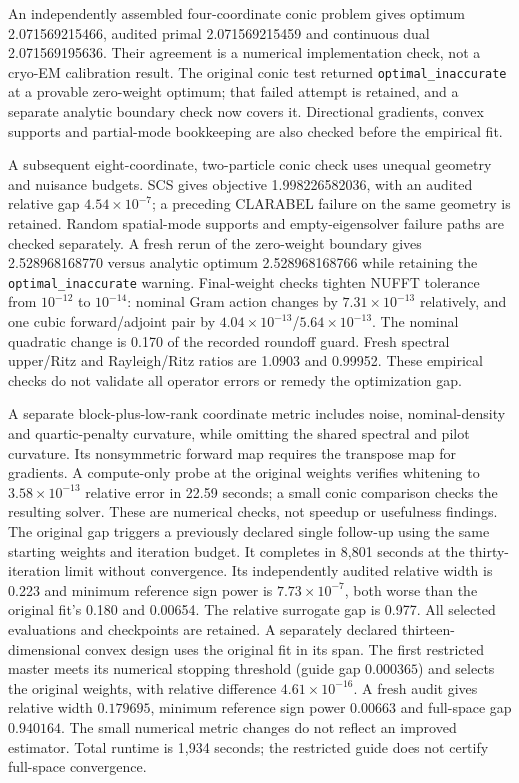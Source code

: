 An independently assembled four-coordinate conic problem gives optimum
2.071569215466, audited primal 2.071569215459 and continuous dual
2.071569195636. Their agreement is a numerical implementation check, not a
cryo-EM calibration result. The original conic test returned
\texttt{optimal\_inaccurate} at a provable zero-weight optimum; that failed
attempt is retained, and a separate analytic boundary check now covers it.
Directional gradients, convex supports and partial-mode bookkeeping are also
checked before the empirical fit.

A subsequent eight-coordinate, two-particle conic check uses unequal geometry
and nuisance budgets. SCS gives objective 1.998226582036, with an audited
relative gap $4.54\times10^{-7}$; a preceding CLARABEL failure on the same
geometry is retained. Random spatial-mode supports and empty-eigensolver failure
paths are checked separately. A fresh rerun of the zero-weight boundary gives
2.528968168770 versus analytic optimum 2.528968168766 while retaining the
\texttt{optimal\_inaccurate} warning. Final-weight checks tighten NUFFT
tolerance from $10^{-12}$ to $10^{-14}$: nominal Gram action changes by
$7.31\times10^{-13}$ relatively, and one cubic forward/adjoint pair by
$4.04\times10^{-13}$/$5.64\times10^{-13}$. The nominal quadratic change is
0.170 of the recorded roundoff guard. Fresh spectral upper/Ritz and
Rayleigh/Ritz ratios are 1.0903 and 0.99952. These empirical checks do not
validate all operator errors or remedy the optimization gap.

A separate block-plus-low-rank coordinate metric includes noise, nominal-density
and quartic-penalty curvature, while omitting the shared spectral and pilot
curvature. Its nonsymmetric forward map requires the transpose map for gradients.
A compute-only probe at the original weights verifies whitening to
$3.58\times10^{-13}$ relative error in 22.59 seconds; a small conic comparison
checks the resulting solver. These are numerical checks, not speedup or
usefulness findings. The original gap triggers a previously declared single
follow-up using the same starting weights and iteration budget. It completes
in 8,801 seconds at the thirty-iteration limit without convergence. Its
independently audited relative width is 0.223 and minimum reference sign power
is $7.73\times10^{-7}$, both worse than the original fit's 0.180 and 0.00654.
The relative surrogate gap is 0.977. All selected evaluations and checkpoints
are retained. A separately declared thirteen-dimensional convex design uses
the original fit in its span. The first restricted master meets its numerical
stopping threshold (guide gap $0.000365$) and selects the original weights,
with relative difference $4.61\times10^{-16}$. A fresh audit gives relative
width $0.179695$, minimum reference sign power $0.00663$ and full-space gap
$0.940164$. The small numerical metric changes do not reflect an improved
estimator. Total runtime is 1,934 seconds; the restricted guide does not certify
full-space convergence.


